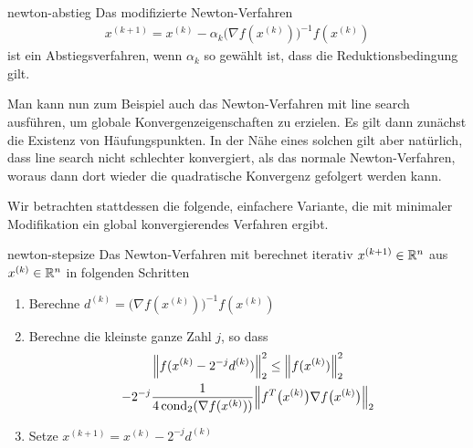 \begin{Korollar}{newton-abstieg}
  Das modifizierte Newton-Verfahren
  \begin{gather}
    x^{(k+1)} = x^{(k)} - \alpha_k \bigl(\nabla f(x^{(k)})\bigr)^{-1} f(x^{(k)})
  \end{gather}
  ist ein Abstiegsverfahren, wenn $\alpha_k$ so gewählt ist, dass die
  Reduktionsbedingung gilt.
\end{Korollar}

\begin{remark}
  Man kann nun zum Beispiel auch das Newton-Verfahren mit line search
  ausführen, um globale Konvergenzeigenschaften zu erzielen. Es gilt
  dann zunächst die Existenz von Häufungspunkten. In der Nähe eines
  solchen gilt aber natürlich, dass line search nicht schlechter
  konvergiert, als das normale Newton-Verfahren, woraus dann dort
  wieder die quadratische Konvergenz gefolgert werden kann.

  Wir betrachten stattdessen die folgende, einfachere Variante, die
  mit minimaler Modifikation ein global konvergierendes Verfahren
  ergibt.
\end{remark}

\begin{Definition}{newton-stepsize}
  Das Newton-Verfahren mit  berechnet iterativ
  $x^{(k+1)}\in \mathbb R^n$ aus $x^{(k)}\in \mathbb R^n$ in folgenden Schritten
  \begin{enumerate}
  \item Berechne $d^{(k)} = \bigl(\nabla f(x^{(k)})\bigr)^{-1}f(x^{(k)})$
  \item Berechne die kleinste ganze Zahl $j$, so dass
    \begin{multline}
      \norm*{f(x^{(k)}-2^{-j} d^{(k)})}_2^2
      \le \norm*{f(x^{(k)})}_2^2
      \\- 2^{-j} \frac{1}{4\cond_2(\nabla f(x^{(k)}))}
      \norm*{f^T\bigl(x^{(k)}\bigr)\nabla f\bigl(x^{(k)}\bigr)}_2
    \end{multline}
    \item Setze $x^{(k+1)}=x^{(k)}-2^{-j} d^{(k)}$
  \end{enumerate}
\end{Definition}

